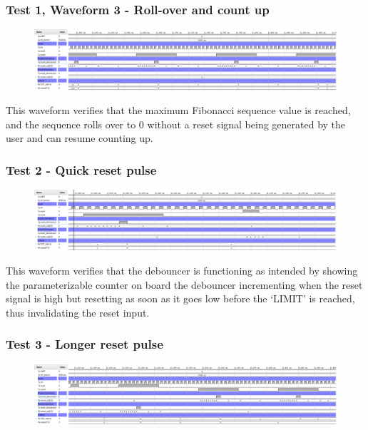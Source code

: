 \documentclass[11pt]{report}
\begin{document}
\subsubsection*{Test 1, Waveform 3 - Roll-over and count up}
\begin{figure}[H]
    \includegraphics[width=\columnwidth]{Waveforms/04_roll-over-and-count.png}
\end{figure}
This waveform verifies that the maximum Fibonacci sequence value is reached, and the sequence rolls over to 0 without a reset signal being generated by the user and can resume counting up.

\subsubsection*{Test 2 - Quick reset pulse}
\begin{figure}[H]
    \includegraphics[width=\columnwidth]{Waveforms/05_quick-reset-pulse.png}
\end{figure}
This waveform verifies that the debouncer is functioning as intended by showing the parameterizable counter on board the debouncer incrementing when the reset signal is high but resetting as soon as it goes low before the `LIMIT' is reached, thus invalidating the reset input.

\subsubsection*{Test 3 - Longer reset pulse}
\begin{figure}[H]
    \includegraphics[width=\columnwidth]{Waveforms/06_longer-reset-pulse.png}
\end{figure}
\end{document}
